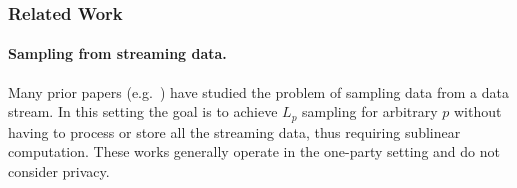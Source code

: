 

\subsubsection{Related Work}
\paragraph{Sampling from streaming data.}
Many prior papers (e.g.~\cite{cormode2019p,ganguly2007counting,jowhari2011tight,MW10,woodruff2016distributed}) have studied the problem of sampling data from a data stream.  In this setting the goal is to achieve $L_p$ sampling for arbitrary $p$ without having to process or store all the streaming data, thus requiring sublinear computation.  These works generally operate in the one-party setting and do not consider privacy.  




